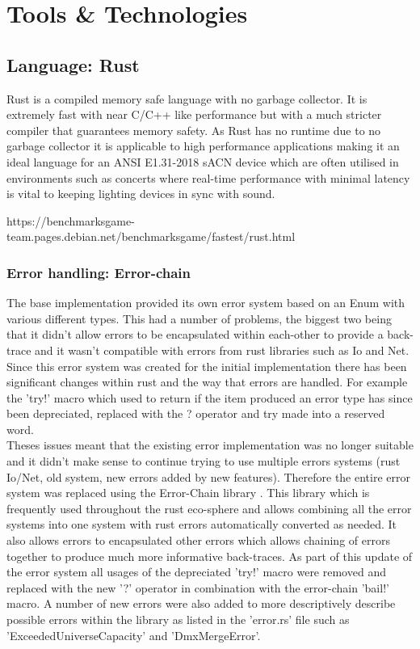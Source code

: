 \documentclass[11pt,a4paper]{article}
\begin{document}
\section{Tools \& Technologies}
\subsection{Language: Rust}
Rust \cite{RUST_LANG} is a compiled memory safe language with no garbage collector. It is extremely fast with near C/C++ like performance \cite{RUST_C_COMPARISON} but with a much stricter compiler that guarantees memory safety. As Rust has no runtime due to no garbage collector it is applicable to high performance applications making it an ideal language for an ANSI E1.31-2018 sACN device which are often utilised in environments such as concerts where real-time performance with minimal latency is vital to keeping lighting devices in sync with sound.

https://benchmarksgame-team.pages.debian.net/benchmarksgame/fastest/rust.html

\subsubsection{Error handling: Error-chain}
The base implementation provided its own error system based on an Enum with various different types. This had a number of problems, the biggest two being that it didn't allow errors to be encapsulated within each-other to provide a back-trace and it wasn't compatible with errors from rust libraries such as Io and Net. Since this error system was created for the initial implementation there has been significant changes within rust and the way that errors are handled. For example the 'try!' \cite{RUST_TRY} macro which used to return if the item produced an error type has since been depreciated, replaced with the ? operator and try made into a reserved word.\\

Theses issues meant that the existing error implementation was no longer suitable and it didn't make sense to continue trying to use multiple errors systems (rust Io/Net, old system, new errors added by new features). Therefore the entire error system was replaced using the Error-Chain library \cite{ERROR_CHAIN}. This library which is frequently used throughout the rust eco-sphere and allows combining all the error systems into one system with rust errors automatically converted as needed. It also allows errors to encapsulated other errors which allows chaining of errors together to produce much more informative back-traces. As part of this update of the error system all usages of the depreciated 'try!' macro were removed and replaced with the new '?' operator in combination with the error-chain 'bail!' macro. A number of new errors were also added to more descriptively describe possible errors within the library as listed in the 'error.rs' file such as 'ExceededUniverseCapacity' and 'DmxMergeError'. \\
\end{document}

